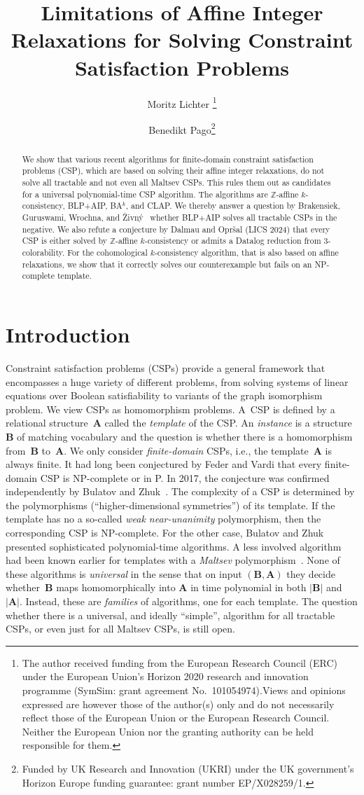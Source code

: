 \documentclass[a4paper,english, thm-restate]{lipics-v2021}
\title{Limitations of Affine Integer Relaxations for Solving Constraint Satisfaction Problems}
\author{Moritz Lichter \footnote{The author received funding from the European Research Council (ERC) under the European Union’s Horizon 2020 research and innovation programme (SymSim: grant agreement No.\ 101054974).Views and opinions expressed are however
		those of the author(s) only and do not necessarily reflect those of the European
		Union or the European Research Council. Neither the European Union nor
		the granting authority can be held responsible for them.}}{RWTH Aachen University, Germany}{lichter@lics.rwth-aachen.de}{}{}
\author{Benedikt Pago\footnote{Funded by UK Research and Innovation (UKRI) under the UK government’s Horizon Europe funding guarantee: grant number EP/X028259/1.}}{University of Cambridge, UK}{benedikt.pago@cl.cam.ac.uk}{}{}
\newcommand{\StructA}{\mathbf{A}}
\newcommand{\StructB}{\mathbf{B}}
\begin{document}
	


	\maketitle
	
	
	\begin{abstract}
		\noindent We show that various recent algorithms for finite-domain constraint satisfaction problems (CSP), which are based on solving their affine integer relaxations, do not solve all tractable and not even all Maltsev CSPs. This rules them out as candidates for a universal polynomial-time CSP algorithm.
		The algorithms are $\mathbb{Z}$-affine $k$-consistency, BLP+AIP, BA$^{k}$, and CLAP. We thereby answer a question by Brakensiek, Guruswami, Wrochna, and Živný~\cite{BrakensiekGWZ2020} whether BLP+AIP solves all tractable CSPs in the negative.
		We also refute a conjecture by Dalmau and Opr\v{s}al \cite{DalmauOprsal2024} (LICS 2024) that every CSP is either solved by $\mathbb{Z}$-affine $k$-consistency or admits a Datalog reduction from 3-colorability.
		For the cohomological $k$-consistency algorithm, that is also based on  affine relaxations, we show that it correctly solves our counterexample but fails on an NP-complete template. 
	\end{abstract}	
	
	
	
	
	\section{Introduction}
	Constraint satisfaction problems (CSPs) provide a general framework that encompasses a huge variety of different problems, from solving systems of linear equations over Boolean satisfiability to variants of the graph isomorphism problem.
	We view CSPs as homomorphism problems. A~CSP is defined by a relational structure~$\StructA$ called the \emph{template} of the CSP.
	An \emph{instance} is a structure~$\StructB$ of matching vocabulary and the question is whether there is a homomorphism from~$\StructB$ to~$\StructA$.
	We only consider \emph{finite-domain} CSPs, i.e., the template~$\StructA$ is always finite.
	It had long been conjectured by Feder and Vardi \cite{feder1993monotone} that every finite-domain CSP is NP-complete or in P.
	In 2017, the conjecture was confirmed independently by Bulatov \cite{bulatov} and Zhuk~\cite{zhuk}.
	The complexity of a CSP is determined by the polymorphisms (``higher-dimensional symmetries'') of its template.
	If the template has no a so-called  \emph{weak near-unanimity} polymorphism, then the corresponding CSP is NP-complete.
	For the other case,
	Bulatov and Zhuk presented sophisticated polynomial-time algorithms.
	A less involved algorithm had been known earlier for templates with a \emph{Maltsev} polymorphism~\cite{BulatovDalmau2006}.
	None of these algorithms is \emph{universal} in the sense that on input $(\StructB, \StructA)$ they decide whether~$\StructB$ maps homomorphically into $\StructA$ in time polynomial in both $|\StructB|$ and $|\StructA|$. Instead, these are \emph{families} of algorithms, one for each template. The question whether there is a universal, and ideally ``simple'', algorithm for all tractable CSPs, or even just for all Maltsev CSPs, is still open.  
	
\end{document}
